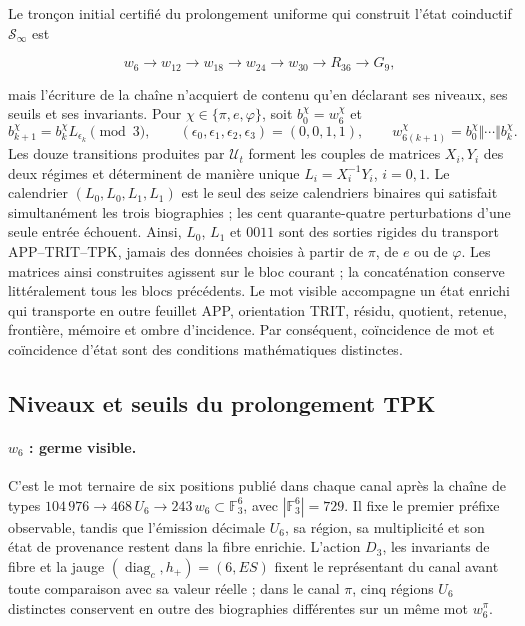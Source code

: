 Le tronçon initial certifié du prolongement uniforme qui construit
l'état coinductif \(\mathcal S_\infty\) est

\[
w_6\longrightarrow w_{12}\longrightarrow w_{18}\longrightarrow w_{24}
\longrightarrow w_{30}\longrightarrow R_{36}\longrightarrow G_9,
\]

mais l'écriture de la chaîne n'acquiert de contenu qu'en déclarant ses
niveaux, ses seuils et ses invariants. Pour
\(\chi\in\{\pi,e,\varphi\}\), soit \(b_0^\chi=w_6^\chi\) et
\[
 b_{k+1}^\chi=b_k^\chi L_{\epsilon_k}\pmod 3,
 \qquad
 (\epsilon_0,\epsilon_1,\epsilon_2,\epsilon_3)=(0,0,1,1),
 \qquad
 w_{6(k+1)}^\chi=b_0^\chi\Vert\cdots\Vert b_k^\chi.
\]
Les douze transitions produites par \(\mathcal U_t\) forment les couples de
matrices \(X_i,Y_i\) des deux régimes et déterminent de manière unique
\(L_i=X_i^{-1}Y_i\), \(i=0,1\). Le calendrier
\((L_0,L_0,L_1,L_1)\) est le seul des seize calendriers binaires qui
satisfait simultanément les trois biographies ; les cent quarante-quatre
perturbations d'une seule entrée échouent. Ainsi, \(L_0\), \(L_1\) et
\(0011\) sont des sorties rigides du transport APP--TRIT--TPK, jamais des données
choisies à partir de \(\pi\), de \(e\) ou de \(\varphi\). Les matrices ainsi
construites agissent sur le bloc courant ; la concaténation conserve
littéralement tous les blocs précédents. Le mot visible accompagne un état enrichi qui transporte
en outre feuillet APP, orientation TRIT, résidu, quotient, retenue, frontière,
mémoire et ombre d'incidence. Par conséquent, coïncidence de mot et
coïncidence d'état sont des conditions mathématiques distinctes.

\subsection*{Niveaux et seuils du prolongement TPK}
\label{sec:umbrales-prolongacion-tpk-inaugural}

\paragraph{\(w_6\) : germe visible.}
C'est le mot ternaire de six positions publié dans chaque canal après
la chaîne de types
\(104\,976\to468\,U_6\to243\,w_6\subset\mathbb F_3^6\), avec
\(|\mathbb F_3^6|=729\).
Il fixe le premier préfixe observable, tandis que l'émission décimale \(U_6\), sa
région, sa multiplicité et son état de provenance restent dans la fibre
enrichie. L'action \(D_3\), les invariants de fibre et la jauge
\((\operatorname{diag}_c,h_+)=(6,ES)\) fixent le représentant du canal avant
toute comparaison avec sa valeur réelle ; dans le canal \(\pi\), cinq
régions \(U_6\) distinctes conservent en outre des biographies différentes sur un
même mot \(w_6^\pi\).

